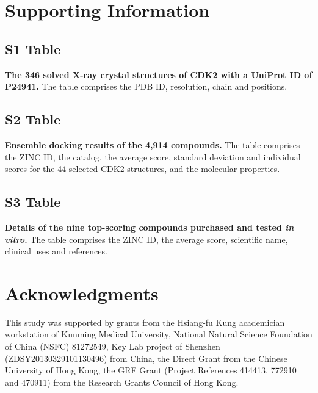 \documentclass[10pt,letterpaper]{article}
\begin{document}
\section*{Supporting Information}


\subsection*{S1 Table}
\label{S1_Table}
{\bf The 346 solved X-ray crystal structures of CDK2 with a UniProt ID of P24941.} The table comprises the PDB ID, resolution, chain and positions.%

\subsection*{S2 Table}
\label{S2_Table}
{\bf Ensemble docking results of the 4,914 compounds.} The table comprises the ZINC ID, the catalog, the average score, standard deviation and individual scores for the 44 selected CDK2 structures, and the molecular properties.%

\subsection*{S3 Table}
\label{S3_Table}
{\bf Details of the nine top-scoring compounds purchased and tested \textit{in vitro}.} The table comprises the ZINC ID, the average score, scientific name, clinical uses and references.%

\section*{Acknowledgments}

This study was supported by grants from the Hsiang-fu Kung academician workstation of Kunming Medical University, National Natural Science Foundation of China (NSFC) 81272549, Key Lab project of Shenzhen (ZDSY20130329101130496) from China, the Direct Grant from the Chinese University of Hong Kong, the GRF Grant (Project References 414413, 772910 and 470911) from the Research Grants Council of Hong Kong.
\end{document}
